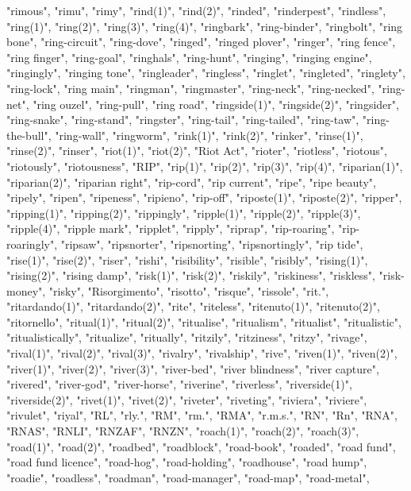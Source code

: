 "rimous",
"rimu",
"rimy",
"rind(1)",
"rind(2)",
"rinded",
"rinderpest",
"rindless",
"ring(1)",
"ring(2)",
"ring(3)",
"ring(4)",
"ringbark",
"ring-binder",
"ringbolt",
"ring bone",
"ring-circuit",
"ring-dove",
"ringed",
"ringed plover",
"ringer",
"ring fence",
"ring finger",
"ring-goal",
"ringhals",
"ring-hunt",
"ringing",
"ringing engine",
"ringingly",
"ringing tone",
"ringleader",
"ringless",
"ringlet",
"ringleted",
"ringlety",
"ring-lock",
"ring main",
"ringman",
"ringmaster",
"ring-neck",
"ring-necked",
"ring-net",
"ring ouzel",
"ring-pull",
"ring road",
"ringside(1)",
"ringside(2)",
"ringsider",
"ring-snake",
"ring-stand",
"ringster",
"ring-tail",
"ring-tailed",
"ring-taw",
"ring-the-bull",
"ring-wall",
"ringworm",
"rink(1)",
"rink(2)",
"rinker",
"rinse(1)",
"rinse(2)",
"rinser",
"riot(1)",
"riot(2)",
"Riot Act",
"rioter",
"riotless",
"riotous",
"riotously",
"riotousness",
"RIP",
"rip(1)",
"rip(2)",
"rip(3)",
"rip(4)",
"riparian(1)",
"riparian(2)",
"riparian right",
"rip-cord",
"rip current",
"ripe",
"ripe beauty",
"ripely",
"ripen",
"ripeness",
"ripieno",
"rip-off",
"riposte(1)",
"riposte(2)",
"ripper",
"ripping(1)",
"ripping(2)",
"rippingly",
"ripple(1)",
"ripple(2)",
"ripple(3)",
"ripple(4)",
"ripple mark",
"ripplet",
"ripply",
"riprap",
"rip-roaring",
"rip-roaringly",
"ripsaw",
"ripsnorter",
"ripsnorting",
"ripsnortingly",
"rip tide",
"rise(1)",
"rise(2)",
"riser",
"rishi",
"risibility",
"risible",
"risibly",
"rising(1)",
"rising(2)",
"rising damp",
"risk(1)",
"risk(2)",
"riskily",
"riskiness",
"riskless",
"risk-money",
"risky",
"Risorgimento",
"risotto",
"risque",
"rissole",
"rit.",
"ritardando(1)",
"ritardando(2)",
"rite",
"riteless",
"ritenuto(1)",
"ritenuto(2)",
"ritornello",
"ritual(1)",
"ritual(2)",
"ritualise",
"ritualism",
"ritualist",
"ritualistic",
"ritualistically",
"ritualize",
"ritually",
"ritzily",
"ritziness",
"ritzy",
"rivage",
"rival(1)",
"rival(2)",
"rival(3)",
"rivalry",
"rivalship",
"rive",
"riven(1)",
"riven(2)",
"river(1)",
"river(2)",
"river(3)",
"river-bed",
"river blindness",
"river capture",
"rivered",
"river-god",
"river-horse",
"riverine",
"riverless",
"riverside(1)",
"riverside(2)",
"rivet(1)",
"rivet(2)",
"riveter",
"riveting",
"riviera",
"riviere",
"rivulet",
"riyal",
"RL",
"rly.",
"RM",
"rm.",
"RMA",
"r.m.s.",
"RN",
"Rn",
"RNA",
"RNAS",
"RNLI",
"RNZAF",
"RNZN",
"roach(1)",
"roach(2)",
"roach(3)",
"road(1)",
"road(2)",
"roadbed",
"roadblock",
"road-book",
"roaded",
"road fund",
"road fund licence",
"road-hog",
"road-holding",
"roadhouse",
"road hump",
"roadie",
"roadless",
"roadman",
"road-manager",
"road-map",
"road-metal",
